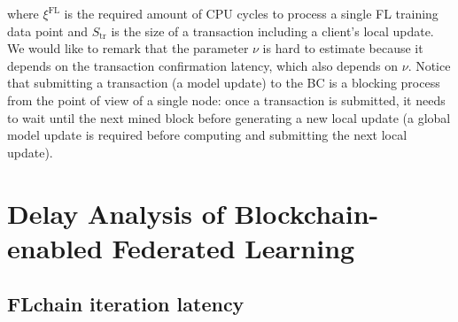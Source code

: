 \documentclass[10pt,journal,compsoc]{IEEEtran}
\begin{document}
where $\xi^\text{FL}$ is the required amount of CPU cycles to process a single FL training data point and $S_\text{tr}$ is the size of a transaction including a client's local update. We would like to remark that the parameter $\nu$ is hard to estimate because it depends on the transaction confirmation latency, which also depends on $\nu$. Notice that submitting a transaction (a model update) to the BC is a blocking process from the point of view of a single node: once a transaction is submitted, it needs to wait until the next mined block before generating a new local update (a global model update is required before computing and submitting the next local update). %

\section{Delay Analysis of Blockchain-enabled Federated Learning}
\label{section:delay_bc}


\subsection{FLchain iteration latency}
\end{document}
